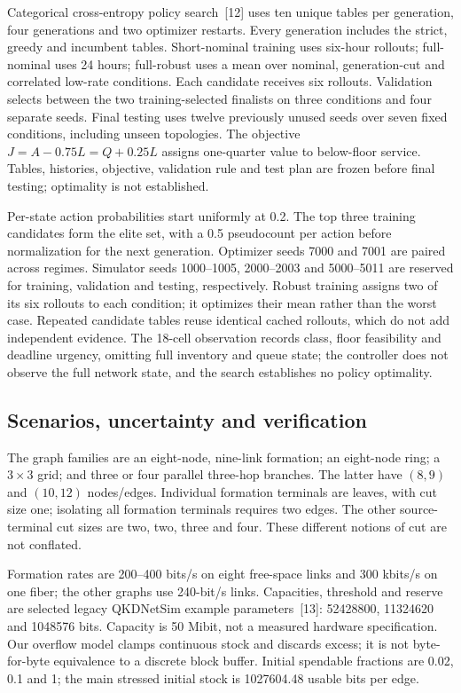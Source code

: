 \documentclass[conference,a4paper]{IEEEtran}
\begin{document}
Categorical cross-entropy policy search~[12] uses ten unique tables per generation, four generations and two optimizer restarts. Every generation includes the strict, greedy and incumbent tables. Short-nominal training uses six-hour rollouts; full-nominal uses 24 hours; full-robust uses a mean over nominal, generation-cut and correlated low-rate conditions. Each candidate receives six rollouts. Validation selects between the two training-selected finalists on three conditions and four separate seeds. Final testing uses twelve previously unused seeds over seven fixed conditions, including unseen topologies. The objective $J=A-0.75L=Q+0.25L$ assigns one-quarter value to below-floor service. Tables, histories, objective, validation rule and test plan are frozen before final testing; optimality is not established.

Per-state action probabilities start uniformly at 0.2. The top three training candidates form the elite set, with a 0.5 pseudocount per action before normalization for the next generation. Optimizer seeds 7000 and 7001 are paired across regimes. Simulator seeds 1000--1005, 2000--2003 and 5000--5011 are reserved for training, validation and testing, respectively. Robust training assigns two of its six rollouts to each condition; it optimizes their mean rather than the worst case. Repeated candidate tables reuse identical cached rollouts, which do not add independent evidence. The 18-cell observation records class, floor feasibility and deadline urgency, omitting full inventory and queue state; the controller does not observe the full network state, and the search establishes no policy optimality.

\subsection{Scenarios, uncertainty and verification}
The graph families are an eight-node, nine-link formation; an eight-node ring; a $3\times3$ grid; and three or four parallel three-hop branches. The latter have $(8,9)$ and $(10,12)$ nodes/edges. Individual formation terminals are leaves, with cut size one; isolating all formation terminals requires two edges. The other source-terminal cut sizes are two, two, three and four. These different notions of cut are not conflated.

Formation rates are 200--400 bits/s on eight free-space links and 300 kbits/s on one fiber; the other graphs use 240-bit/s links. Capacities, threshold and reserve are selected legacy QKDNetSim example parameters~[13]: 52428800, 11324620 and 1048576 bits. Capacity is 50 Mibit, not a measured hardware specification. Our overflow model clamps continuous stock and discards excess; it is not byte-for-byte equivalence to a discrete block buffer. Initial spendable fractions are 0.02, 0.1 and 1; the main stressed initial stock is 1027604.48 usable bits per edge.
\end{document}
